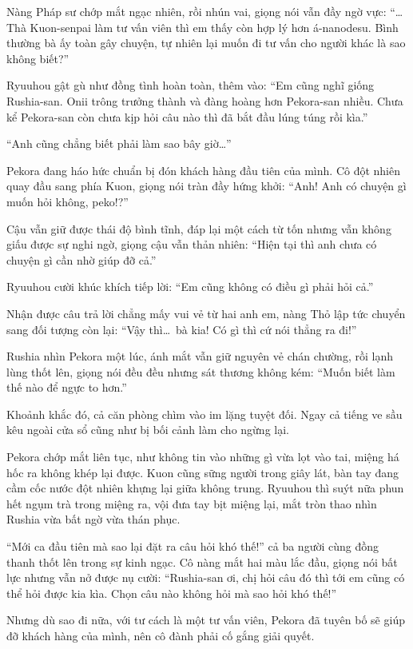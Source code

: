 \documentclass[../main.tex]{subfiles}
\begin{document}
Nàng Pháp sư chớp mắt ngạc nhiên, rồi nhún vai, giọng nói vẫn đầy ngờ vực: ``\dots Thà Kuon-senpai làm tư vấn viên thì em thấy còn hợp lý hơn á-nanodesu. Bình thường bà ấy toàn gây chuyện, tự nhiên lại muốn đi tư vấn cho người khác là sao không biết?''

Ryuuhou gật gù như đồng tình hoàn toàn, thêm vào: ``Em cũng nghĩ giống Rushia-san. Onii trông trưởng thành và đàng hoàng hơn Pekora-san nhiều. Chưa kể Pekora-san còn chưa kịp hỏi câu nào thì đã bắt đầu lúng túng rồi kìa.''

``Anh cũng chẳng biết phải làm sao bây giờ\dots''

Pekora đang háo hức chuẩn bị đón khách hàng đầu tiên của mình. Cô đột nhiên quay đầu sang phía Kuon, giọng nói tràn đầy hứng khởi: ``Anh! Anh có chuyện gì muốn hỏi không, peko!?''

Cậu vẫn giữ được thái độ bình tĩnh, đáp lại một cách từ tốn nhưng vẫn không giấu được sự nghi ngờ, giọng cậu vẫn thản nhiên: ``Hiện tại thì anh chưa có chuyện gì cần nhờ giúp đỡ cả.''

Ryuuhou cười khúc khích tiếp lời: ``Em cũng không có điều gì phải hỏi cả.''

Nhận được câu trả lời chẳng mấy vui vẻ từ hai anh em, nàng Thỏ lập tức chuyển sang đối tượng còn lại: ``Vậy thì\dots\ bà kia! Có gì thì cứ nói thẳng ra đi!''

Rushia nhìn Pekora một lúc, ánh mắt vẫn giữ nguyên vẻ chán chường, rồi lạnh lùng thốt lên, giọng nói đều đều nhưng sát thương không kém: ``Muốn biết làm thế nào để ngực to hơn.''


Khoảnh khắc đó, cả căn phòng chìm vào im lặng tuyệt đối. Ngay cả tiếng ve sầu kêu ngoài cửa sổ cũng như bị bối cảnh làm cho ngừng lại.

Pekora chớp mắt liên tục, như không tin vào những gì vừa lọt vào tai, miệng há hốc ra không khép lại được. Kuon cũng sững người trong giây lát, bàn tay đang cầm cốc nước đột nhiên khựng lại giữa không trung. Ryuuhou thì suýt nữa phun hết ngụm trà trong miệng ra, vội đưa tay bịt miệng lại, mắt tròn thao nhìn Rushia vừa bất ngờ vừa thán phục.

``Mới ca đầu tiên mà sao lại đặt ra câu hỏi khó thế!'' cả ba người cùng đồng thanh thốt lên trong sự kinh ngạc. Cô nàng mắt hai màu lắc đầu, giọng nói bất lực nhưng vẫn nở được nụ cười: ``Rushia-san ơi, chị hỏi câu đó thì tới em cũng có thể hỏi được kia kìa. Chọn câu nào không hỏi mà sao hỏi khó thế!''

Nhưng dù sao đi nữa, với tư cách là một tư vấn viên, Pekora đã tuyên bố sẽ giúp đỡ khách hàng của mình, nên cô đành phải cố gắng giải quyết.
\end{document}
